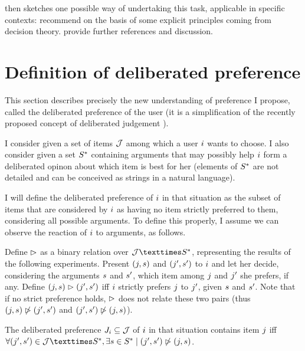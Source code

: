 \documentclass[french, english]{da2pl2018}
\begin{document}
 then sketches one possible way of undertaking this task, applicable in specific contexts: recommend on the basis of some explicit principles coming from decision theory.  provide further references and discussion.

\section{Definition of deliberated preference}
\label{sec:def}
This section describes precisely the new understanding of preference I propose, called the deliberated preference of the user (it is a simplification of the recently proposed concept of deliberated judgement \citep{cailloux_formal_2017}).

I consider given a set of items $\mathcal{J}$ among which a user $i$ wants to choose. I also consider given a set $S^*$ containing arguments that may possibly help $i$ form a deliberated opinon about which item is best for her (elements of $S^*$ are not detailed and can be conceived as strings in a natural language). 

I will define the deliberated preference of $i$ in that situation as the subset of items that are considered by $i$ as having no item strictly preferred to them, considering all possible arguments. To define this properly, I assume we can observe the reaction of $i$ to arguments, as follows. 

Define $\vartriangleright$ as a binary relation over $\allitems × \allargs$, representing the results of the following experiments. Present $(j, s)$ and $(j', s')$ to $i$ and let her decide, considering the arguments $s$ and $s'$, which item among $j$ and $j'$ she prefers, if any. 
Define $(j, s) \vartriangleright (j', s')$ iff $i$ strictly prefers $j$ to $j'$, given $s$ and $s'$. Note that if no strict preference holds, $\vartriangleright$ does not relate these two pairs (thus $(j, s) \not\vartriangleright (j', s')$ and $(j', s') \not\vartriangleright (j, s)$). 

The deliberated preference $J_i \subseteq \mathcal{J}$ of $i$ in that situation contains item $j$ iff $\forall (\itm', \ar') \in \allitems × \allargs, \exists \ar \in \allargs \suchthat (\itm', \ar') \nibeats (\itm, \ar)$.
\end{document}
